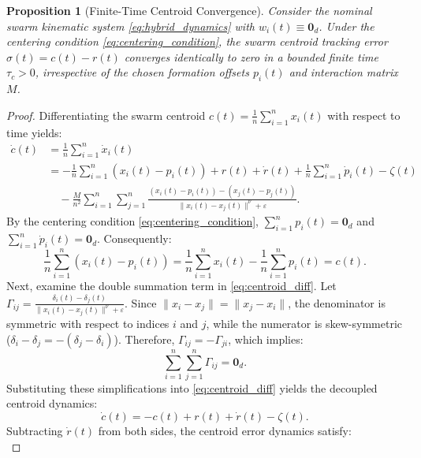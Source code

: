 \documentclass[11pt]{article}
\newtheorem{proposition}{Proposition}
\begin{document}
\begin{proposition}[Finite-Time Centroid Convergence]
Consider the nominal swarm kinematic system \eqref{eq:hybrid_dynamics} with $w_i(t) \equiv \mathbf{0}_d$. Under the centering condition \eqref{eq:centering_condition}, the swarm centroid tracking error $\sigma(t) = c(t) - r(t)$ converges identically to zero in a bounded finite time $\tau_c > 0$, irrespective of the chosen formation offsets $p_i(t)$ and interaction matrix $M$.
\end{proposition}

\begin{proof}
Differentiating the swarm centroid $c(t) = \frac{1}{n}\sum_{i=1}^{n} x_i(t)$ with respect to time yields:
\begin{align}
\dot{c}(t) &= \frac{1}{n}\sum_{i=1}^{n} \dot{x}_i(t) \nonumber \\
&= -\frac{1}{n}\sum_{i=1}^{n}(x_i(t) - p_i(t)) + r(t) + \dot{r}(t) + \frac{1}{n}\sum_{i=1}^{n}\dot{p}_i(t) - \zeta(t) \nonumber \\
&\quad - \frac{M}{n^2}\sum_{i=1}^{n}\sum_{j=1}^{n} \frac{(x_i(t) - p_i(t)) - (x_j(t) - p_j(t))}{\|x_i(t) - x_j(t)\|^\nu + \varepsilon}.
\label{eq:centroid_diff}
\end{align}
By the centering condition \eqref{eq:centering_condition}, $\sum_{i=1}^{n} p_i(t) = \mathbf{0}_d$ and $\sum_{i=1}^{n} \dot{p}_i(t) = \mathbf{0}_d$. Consequently:
\begin{equation}
\frac{1}{n}\sum_{i=1}^{n}(x_i(t) - p_i(t)) = \frac{1}{n}\sum_{i=1}^{n} x_i(t) - \frac{1}{n}\sum_{i=1}^{n} p_i(t) = c(t).
\end{equation}
Next, examine the double summation term in \eqref{eq:centroid_diff}. Let $\Gamma_{ij} = \frac{\delta_i(t) - \delta_j(t)}{\|x_i(t) - x_j(t)\|^\nu + \varepsilon}$. Since $\|x_i - x_j\| = \|x_j - x_i\|$, the denominator is symmetric with respect to indices $i$ and $j$, while the numerator is skew-symmetric ($\delta_i - \delta_j = -(\delta_j - \delta_i)$). Therefore, $\Gamma_{ij} = -\Gamma_{ji}$, which implies:
\begin{equation}
\sum_{i=1}^{n}\sum_{j=1}^{n} \Gamma_{ij} = \mathbf{0}_d.
\end{equation}
Substituting these simplifications into \eqref{eq:centroid_diff} yields the decoupled centroid dynamics:
\begin{equation}
\dot{c}(t) = -c(t) + r(t) + \dot{r}(t) - \zeta(t).
\end{equation}
Subtracting $\dot{r}(t)$ from both sides, the centroid error dynamics satisfy:
\begin{equation}

\end{equation}
\end{proof}
\end{document}
